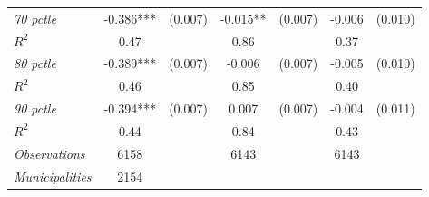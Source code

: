 \begin{tabular}{lcccccc}
\textit{70 pctle}          		  &  -0.386***    & (0.007)      &   -0.015**        &  (0.007)      &     -0.006  &    (0.010)       \\
$R^{2}$			           	   		  &  0.47   & 	   &     0.86   	&		 &     0.37   &   \\

\textit{80 pctle}          		  &  -0.389***    & (0.007)      &   -0.006        &  (0.007)      &     -0.005  &    (0.010)       \\
$R^{2}$			           	   		  &  0.46   & 	   &     0.85   	&		 &     0.40   &   \\

\textit{90 pctle}          		  &  -0.394***    & (0.007)      &   0.007        &  (0.007)      &     -0.004  &    (0.011)       \\
$R^{2}$			           	   		  &  0.44   & 	   &     0.84   	&		 &     0.43   &  \\


\hline		

\textit{Observations}                 &   6158    &   & 6143    &  &  6143   &  		\\
\textit{Municipalities}               &   2154   &   &    &  &    &  		\\
\hline		
\hline		

\end{tabular}%
